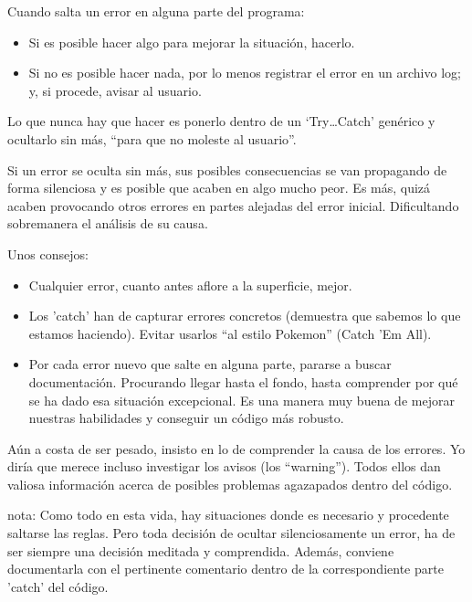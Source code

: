 \documentclass[spanish,12pt,a4paper,final,oneside]{book}
\begin{document}
Cuando salta un error en alguna parte del programa:
\begin{itemize}
\item Si es posible hacer algo para mejorar la situación, hacerlo.
\item Si no es posible hacer nada, por lo menos registrar el error en un archivo log; y, si procede, avisar al usuario.
\end{itemize}

Lo que nunca hay que hacer es ponerlo dentro de un `Try\ldots Catch' genérico y ocultarlo sin más, ``para que no moleste al usuario''.

Si un error se oculta sin más, sus posibles consecuencias se van propagando de forma silenciosa y es posible que acaben en algo mucho peor. Es más, quizá acaben provocando otros errores en partes alejadas del error inicial. Dificultando sobremanera el análisis de su causa. 

Unos consejos:
\begin{itemize}

\item Cualquier error, cuanto antes aflore a la superficie, mejor.

\item Los 'catch' han de capturar errores concretos (demuestra que sabemos lo que estamos haciendo). Evitar usarlos ``al estilo Pokemon'' (Catch 'Em All).

\item Por cada error nuevo que salte en alguna parte, pararse a buscar documentación. Procurando llegar hasta el fondo, hasta comprender por qué se ha dado esa situación excepcional. Es una manera muy buena de mejorar nuestras habilidades y conseguir un código más robusto.

\end{itemize}

Aún a costa de ser pesado, insisto en lo de comprender la causa de los errores. Yo diría que merece incluso investigar los avisos (los ``warning''). Todos ellos dan valiosa información acerca de posibles problemas agazapados dentro del código.

nota: Como todo en esta vida, hay situaciones donde es necesario y procedente saltarse las reglas. Pero toda decisión de ocultar silenciosamente un error,  ha de ser siempre una decisión meditada y comprendida. Además, conviene documentarla con el pertinente comentario dentro de la correspondiente parte 'catch' del código.
\end{document}
